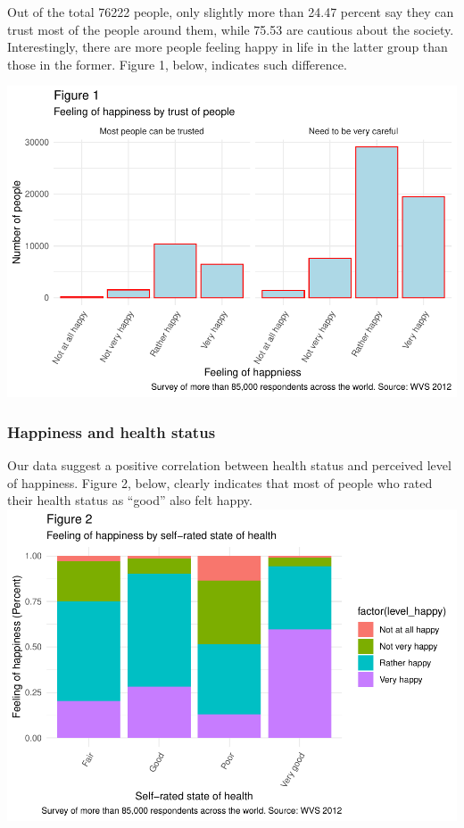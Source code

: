 \documentclass[man, fleqn, noextraspace,floatsintext]{apa6}
\begin{document}
Out of the total 76222 people, only slightly more than 24.47 percent say they can trust most of the people around them, while 75.53 are cautious about the society. Interestingly, there are more people feeling happy in life in the latter group than those in the former. Figure 1, below, indicates such difference.

\includegraphics{610_final_files/figure-latex/unnamed-chunk-1-1.pdf}

\hypertarget{happiness-and-health-status}{%
\subsubsection{Happiness and health status}\label{happiness-and-health-status}}

Our data suggest a positive correlation between health status and perceived level of happiness. Figure 2, below, clearly indicates that most of people who rated their health status as \enquote{good} also felt happy.
\includegraphics{610_final_files/figure-latex/unnamed-chunk-2-1.pdf}
\end{document}
